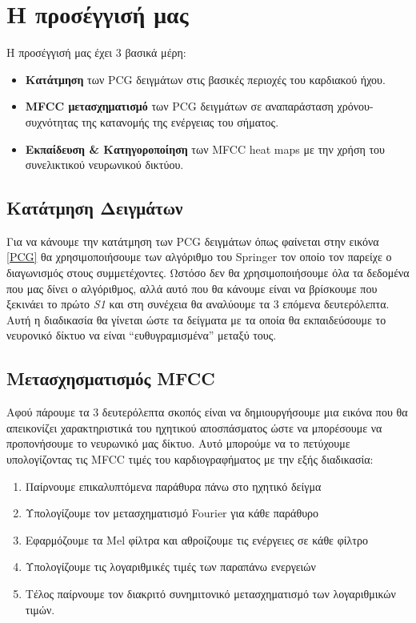 \section{Η προσέγγισή μας}\label{our_approach}

Η προσέγγισή μας έχει 3 βασικά μέρη:
\begin{itemize}
	\item \textbf{Κατάτμηση} των PCG δειγμάτων στις βασικές περιοχές του καρδιακού
	      ήχου.
	\item \textbf{MFCC μετασχηματισμό} των PCG δειγμάτων σε αναπαράσταση
	      χρόνου-συχνότητας της κατανομής της ενέργειας του σήματος.
	\item \textbf{Εκπαίδευση \& Κατηγοροποίηση} των MFCC heat maps με την χρήση
	      του συνελικτικού νευρωνικού δικτύου.
\end{itemize}

\subsection{Κατάτμηση Δειγμάτων}

Για να κάνουμε την κατάτμηση των PCG δειγμάτων όπως φαίνεται στην εικόνα
\ref{PCG} θα χρησιμοποιήσουμε των αλγόριθμο του Springer
\cite{springer2015logistic} τον οποίο τον παρείχε ο διαγωνισμός στους
συμμετέχοντες. Ωστόσο δεν θα χρησιμοποιήσουμε όλα τα δεδομένα που μας δίνει ο
αλγόριθμος, αλλά αυτό που θα κάνουμε είναι να βρίσκουμε που ξεκινάει το πρώτο
\emph{S1} και στη συνέχεια θα αναλύουμε τα 3 επόμενα δευτερόλεπτα. Αυτή η
διαδικασία θα γίνεται ώστε τα δείγματα με τα οποία θα εκπαιδεύσουμε το νευρονικό
δίκτυο να είναι ``ευθυγραμισμένα'' μεταξύ τους.


\subsection{Μετασχησματισμός MFCC}

Αφού πάρουμε τα 3 δευτερόλεπτα σκοπός είναι να δημιουργήσουμε μια εικόνα που θα
απεικονίζει χαρακτηριστικά του ηχητικού αποσπάσματος ώστε να μπορέσουμε να
προπονήσουμε το νευρωνικό μας δίκτυο. Αυτό μπορούμε να το πετύχουμε
υπολογίζοντας τις MFCC τιμές του καρδιογραφήματος με την εξής διαδικασία:

\begin{enumerate}
	\item Παίρνουμε επικαλυπτόμενα παράθυρα πάνω στο ηχητικό δείγμα
	\item Υπολογίζουμε τον μετασχηματισμό Fourier για κάθε παράθυρο
	\item Εφαρμόζουμε τα Mel φίλτρα και αθροίζουμε τις ενέργειες σε κάθε φίλτρο
	\item Υπολογίζουμε τις λογαριθμικές τιμές των παραπάνω ενεργειών
	\item Τέλος παίρνουμε τον διακριτό συνημιτονικό μετασχηματισμό των λογαριθμικών
	      τιμών.
\end{enumerate}

